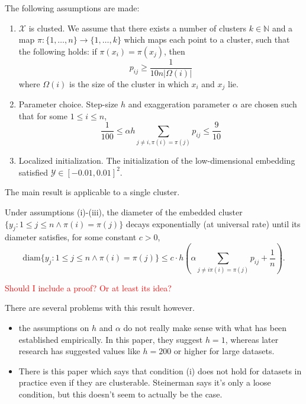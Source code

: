 The following assumptions are made: 
\begin{enumerate}
    \item $\mathcal{X}$ is clusted. We assume that there exists a number of clusters $k \in \mathbb{N}$ and a map $\pi: \{1,\dots,n\} \to \{1,\dots,k\}$ which maps each point to a cluster, such that the following holds: if $\pi(x_i) = \pi(x_j)$, then \begin{equation}
        p_{ij} \geq \frac{1}{10 n |\Omega(i)|}
    \end{equation}
    where $\Omega(i)$ is the size of the cluster in which $x_i$ and $x_j$ lie. 
    \item Parameter choice. Step-size $h$ and exaggeration parameter $\alpha$ are chosen such that for some $1\leq i \leq n$, 
    \begin{equation}
        \frac{1}{100} \leq \alpha h \sum_{j \neq i, \pi(i) = \pi(j)} p_{ij} \leq \frac{9}{10}
    \end{equation}
    \item Localized initialization. The initialization of the low-dimensional embedding satisfied $\mathcal{Y} \in [-0.01, 0.01]^2$. 
\end{enumerate}
The main result is applicable to a single cluster. 

\begin{thm}
    Under assumptions (i)-(iii), the diameter of the embedded cluster $\{y_j: 1 \leq j \leq n \land \pi(i) = \pi(j)\}$ decays exponentially (at universal rate) until its diameter satisfies, for some constant $c > 0$,
    \begin{equation}
        \text{diam} \{y_j: 1 \leq j \leq n \land \pi(i) = \pi(j)\} \leq c \cdot h \left(\alpha \sum_{j \neq i \pi(i) = \pi(j)} p_{ij} + \frac{1}{n} \right). 
    \end{equation}
\end{thm}
\textcolor{red}{Should I include a proof? Or at least its idea?}

There are several problems with this result however. 
\begin{itemize}
    \item the assumptions on $h$ and $\alpha$ do not really make sense with what has been established empirically. In this paper, they suggest $h=1$, whereas later research has suggested values like $h=200$ or higher for large datasets. 
    \item There is this paper which says that condition (i) does not hold for datasets in practice even if they are clusterable. Steinerman says it's only a loose condition, but this doesn't seem to actually be the case. 
\end{itemize}

